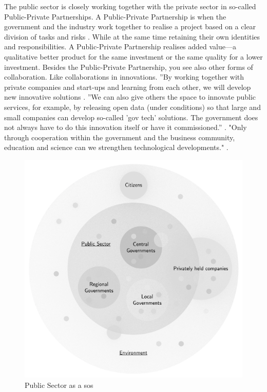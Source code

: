 The public sector is closely working together with the private sector in so-called Public-Private Partnerships. A Public-Private Partnership is when the government and the industry work together to realise a project based on a clear division of tasks and risks \parencite{PIANO}. While at the same time retaining their own identities and responsibilities. A Public-Private Partnership realises added value—a qualitative better product for the same investment or the same quality for a lower investment. Besides the Public-Private Partnership, you see also other forms of collaboration. Like collaborations in innovations. ''By working together with private companies and start-ups and learning from each other, we will develop new innovative solutions \parencite[p.~120]{Digitaleoverheid2021}. ''We can also give others the space to innovate public services, for example, by releasing open data (under conditions) so that large and small companies can develop so-called 'gov tech' solutions. The government does not always have to do this innovation itself or have it commissioned.'' \parencite[p.~120]{Digitaleoverheid2021}. "Only through cooperation within the government and the business community, education and science can we strengthen technological developments." \parencite[p.~68]{Digitaleoverheid2021}.






\begin{figure}[H]
	\centering
	\includegraphics[width=0.5\linewidth]{images/pssystemofsystems}
	\caption[Public Sector as a \gls{sos}]{Public Sector as a \gls{sos}}
	\label{fig:pssystemofsystems}
\end{figure}

